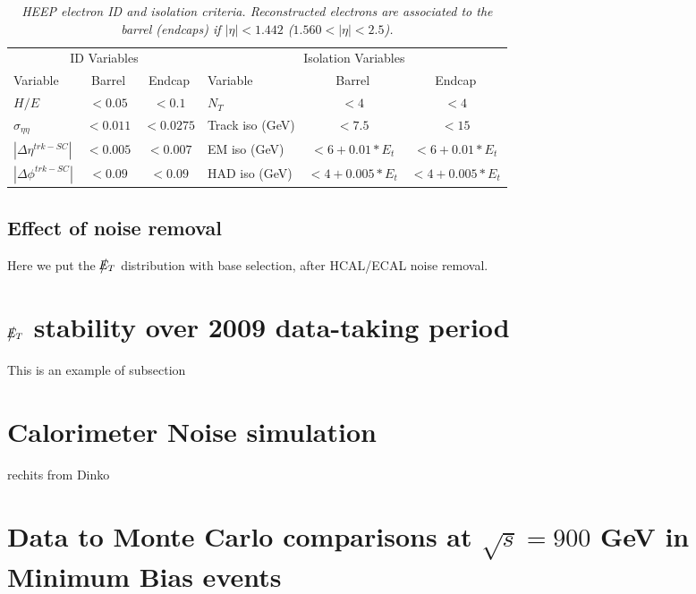 \documentclass{cmspaper}
\def\etmiss{\big\slash\hspace{-1.6ex}{E_T}}
\begin{document}
\begin{table}[htbp]
 \label{tab:HEEPselection}
 \begin{center}
   \begin{tabular}{|lcc|lcc|} \hline
     \multicolumn{3}{|c|}{ID Variables} & \multicolumn{3}{|c|}{Isolation Variables} \\
     Variable & Barrel & Endcap & Variable & Barrel & Endcap  \\ \hline
     $H/E$  & $<0.05$ & $<0.1$ & $N_T$  & $<4$ & $<4$ \\ \hline
     $\sigma_{\eta\eta}$  & $<0.011$ & $<0.0275$ & Track iso (GeV) & $<7.5$ & $<15$ \\ \hline
     $|\Delta\eta^{trk-SC}|$ & $<0.005$ & $<0.007$ & EM iso (GeV) & $<6+0.01*E_{t}$ & $<6+0.01*E_{t}$ \\ \hline
     $|\Delta\phi^{trk-SC}|$ & $<0.09$ & $<0.09$ & HAD iso (GeV) & $<4+0.005*E_{t}$ & $<4+0.005*E_{t}$ \\ \hline
   \end{tabular}
 \caption{\small \sl HEEP electron ID and isolation criteria.
   Reconstructed electrons are associated to the
   barrel (endcaps) if $|\eta|<1.442$ ($1.560<|\eta|<2.5$).}
 \end{center}
\end{table}



\subsection{Effect of noise removal}
Here we put the $\etmiss$ distribution with base selection, after HCAL/ECAL
noise removal.

\section{$\etmiss$ stability over 2009 data-taking period}

This is an example of subsection

\section{Calorimeter Noise simulation}
rechits from Dinko

\section{Data to Monte Carlo comparisons at $\sqrt{s}=900$ GeV in
  Minimum Bias events}
\end{document}
